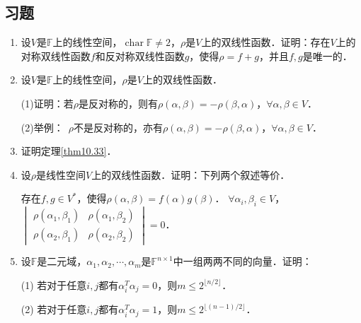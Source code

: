 \documentclass[a4paper,fontset=windows]{ctexbook}
\theoremstyle{definition}
\DeclareMathOperator{\Char}{char}
\DeclareMathOperator{\rank}{rank}
\DeclareMathOperator{\Span}{Span}
\renewcommand{\le}{\leqslant}
\begin{document}
\subsection*{习题}

\begin{enumerate}
\item 设$V$是$\mathbb{F}$上的线性空间，$\Char\mathbb{F}\ne 2$，$\rho$是$V$上的双线性函数．证明：存在$V$上的对称双线性函数$f$和反对称双线性函数$g$，使得$\rho=f+g$，并且$f,g$是唯一的．

\item 设$V$是$\mathbb{F}$上的线性空间，$\rho$是$V$上的双线性函数．

(1)证明：若$\rho$是反对称的，则有$\rho(\alpha,\beta)=-\rho(\beta,\alpha)$，$\forall\alpha,\beta\in V$．

(2)举例：~$\rho$不是反对称的，亦有$\rho(\alpha,\beta)=-\rho(\beta,\alpha)$，$\forall\alpha,\beta\in V$．

\item 证明定理\ref{thm10.33}．

\item 设$\rho$是线性空间$V$上的双线性函数．证明：下列两个叙述等价．

 存在$f,g\in V^*$，使得$\rho(\alpha,\beta)=f(\alpha)g(\beta)$．\quad
{} $\forall\alpha_i,\beta_i\in V$，$\begin{vmatrix}\rho(\alpha_1,\beta_1)&\rho(\alpha_1,\beta_2) \\ \rho(\alpha_2,\beta_1)&\rho(\alpha_2,\beta_2)\end{vmatrix}=0$．

\item 设$\mathbb{F}$是二元域，$\alpha_1,\alpha_2,\cdots,\alpha_m$是$\mathbb{F}^{n\times 1}$中一组两两不同的向量．证明：

(1) 若对于任意$i,j$都有$\alpha_i^T\alpha_j=0$，则$m\le 2^{\lfloor n/2\rfloor}$．


(2) 若对于任意$i,j$都有$\alpha_i^T\alpha_j=1$，则$m\le 2^{\lfloor(n-1)/2\rfloor}$．



\end{enumerate}
\end{document}
